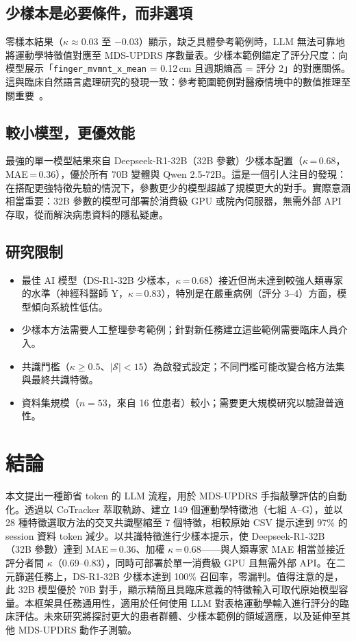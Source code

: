 \documentclass[12pt, a4paper]{article}
\begin{document}
\subsection{少樣本是必要條件，而非選項}
零樣本結果（$\kappa \approx 0.03$ 至 $-0.03$）顯示，缺乏具體參考範例時，LLM 無法可靠地將運動學特徵值對應至 MDS-UPDRS 序數量表。少樣本範例錨定了評分尺度：向模型展示「\texttt{finger\_mvmnt\_x\_mean} = 0.12\,cm 且週期熵高 = 評分 2」的對應關係。這與臨床自然語言處理研究的發現一致：參考範圍範例對醫療情境中的數值推理至關重要~\cite{cite_clinicalnlp}。

\subsection{較小模型，更優效能}
最強的單一模型結果來自 Deepseek-R1-32B（32B 參數）少樣本配置（$\kappa$\,=\,0.68，MAE\,=\,0.36），優於所有 70B 變體與 Qwen 2.5-72B。這是一個引人注目的發現：在搭配更強特徵先驗的情況下，參數更少的模型超越了規模更大的對手。實際意涵相當重要：32B 參數的模型可部署於消費級 GPU 或院內伺服器，無需外部 API 存取，從而解決病患資料的隱私疑慮。

\subsection{研究限制}
\begin{itemize}
    \item 最佳 AI 模型（DS-R1-32B 少樣本，$\kappa$\,=\,0.68）接近但尚未達到較強人類專家的水準（神經科醫師 Y，$\kappa$\,=\,0.83），特別是在嚴重病例（評分 3--4）方面，模型傾向系統性低估。
    \item 少樣本方法需要人工整理參考範例；針對新任務建立這些範例需要臨床人員介入。
    \item 共識門檻（$\kappa \geq 0.5$、$|\mathcal{S}| < 15$）為啟發式設定；不同門檻可能改變合格方法集與最終共識特徵。
    \item 資料集規模（$n = 53$，來自 16 位患者）較小；需要更大規模研究以驗證普適性。
\end{itemize}

\section{結論}

本文提出一種節省 token 的 LLM 流程，用於 MDS-UPDRS 手指敲擊評估的自動化。透過以 CoTracker 萃取軌跡、建立 149 個運動學特徵池（七組 A--G），並以 28 種特徵選取方法的交叉共識壓縮至 7 個特徵，相較原始 CSV 提示達到 97\% 的 session 資料 token 減少。以共識特徵進行少樣本提示，使 Deepseek-R1-32B（32B 參數）達到 MAE\,=\,0.36、加權 $\kappa$\,=\,0.68——與人類專家 MAE 相當並接近評分者間 $\kappa$（0.69--0.83），同時可部署於單一消費級 GPU 且無需外部 API。在二元篩選任務上，DS-R1-32B 少樣本達到 100\% 召回率，零漏判。值得注意的是，此 32B 模型優於 70B 對手，顯示精簡且具臨床意義的特徵輸入可取代原始模型容量。本框架具任務通用性，適用於任何使用 LLM 對表格運動學輸入進行評分的臨床評估。未來研究將探討更大的患者群體、少樣本範例的領域適應，以及延伸至其他 MDS-UPDRS 動作子測驗。
\end{document}
